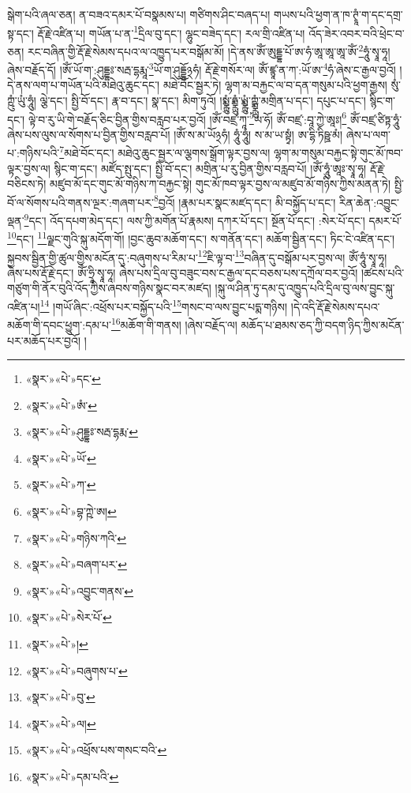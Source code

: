 སྒེག་པའི་ཞལ་ཅན། ན་བཟའ་དམར་པོ་བསྣམས་པ། གཙིགས་ཤིང་བཞད་པ། གཡས་པའི་ཕྱག་ན་ཁ་ཊྭཱཾ་ག་དང་དགྲ་སྟ་དང་། རྡོ་རྗེ་འཛིན་པ། གཡོན་པ་ན་\footnote{«སྣར་»«པེ་»དང་}དྲིལ་བུ་དང་། ལྷུང་བཟེད་དང་། རལ་གྲི་འཛིན་པ། འོད་ཟེར་འབར་བའི་ཕྲེང་བ་ཅན། རང་བཞིན་གྱི་རྡོ་རྗེ་སེམས་དཔའ་ལ་འཁྱུད་པར་བསྒོམ་མོ། །དེ་ནས་ཨོཾ་ཨུདྡྷ་པོ་ཨ་ཧཾ་ཨཱ་ཨཱ་ཨཱ་ཨོཾ་\footnote{«སྣར་»«པེ་»ཨཾ་}ཧཱུཾ་སྭཱ་ཧཱ། ཞེས་བརྗོད་དོ། །ཨོཾ་ཡོ་ག་:ཤུདྡྷཿ་སརྦ་དྷརྨཱ་\footnote{«སྣར་»«པེ་»ཤུདྡྷཿ་སརྦ་དྷརྨ་}ཡོ་ག་ཤུདྡྷོ྅ཧཾ། རྡོ་རྗེ་གསོར་ལ། ཨོཾ་ཛྙཱ་ན་ཀ་:ཡོ་ཨ་\footnote{«སྣར་»«པེ་»ཡོ་}ཧཾ་ཞེས་ང་རྒྱལ་བྱའོ། །དེ་ནས་ལག་པ་གཡོན་པའི་མཐེའུ་ཆུང་དང་། མཐེ་བོང་སྦྱར་ཏེ། ལྷག་མ་བརྐྱང་ལ་བ་དན་གསུམ་པའི་ཕྱག་རྒྱས། སུཾ་ཀྵུཾ་ཡུཾ་ཧཱུཾ། ལྕེ་དང་། སྤྱི་བོ་དང་། རྣ་བ་དང་། སྣ་དང་། མིག་ཏུའོ། །སྨྼྻུཾ་ཧྨྼྻུཾ་ཡྨྼྻུཾ་ཀྵྨྼྻུཾ་མགྲིན་པ་དང་། དཔུང་པ་དང་། སྙིང་ག་དང་། ལྟེ་བ་རུ་ཡི་གེ་བརྗོད་ཅིང་བྱིན་གྱིས་བརླབ་པར་བྱའོ། །ཨོཾ་བཛྲ་ཀཱ་\footnote{«སྣར་»«པེ་»ཀ་}ཡ་ཧོ། ཨོཾ་བཛྲ་:བཱ་ཀྱེ་ཨཱཿ།\footnote{«སྣར་»«པེ་»བྷ་ཀྵེ་ཨ།} ཨོཾ་བཛྲ་ཙིཏྟ་ཧཱུཾ་ཞེས་པས་ལུས་ལ་སོགས་པ་བྱིན་གྱིས་བརླབ་པོ། །ཨོཾ་ས་མ་ཡོ྅ཧཾ། ཧཱུཾ་ཧཱུཾ། ས་མ་ཡ་སྟྭཾ། ཨ་དྷི་ཏིཥྛ་མཾ། ཞེས་པ་ལག་པ་:གཉིས་པའི་\footnote{«སྣར་»«པེ་»གཉིས་ཀའི་}མཐེ་བོང་དང་། མཐེའུ་ཆུང་སྦྱར་ལ་ལྕགས་སྒྲོག་ལྟར་བྱས་ལ། ལྷག་མ་གསུམ་བརྐྱང་སྟེ་གུང་མོ་ཁབ་ལྟར་བྱས་ལ། སྙིང་ག་དང་། མཛོད་སྤུ་དང་། སྤྱི་བོ་དང་། མགྲིན་པ་རུ་བྱིན་གྱིས་བརླབ་པོ། །ཨོཾ་ཧཱུཾ་ཨཱཿ་སྭཱ་ཧཱ། རྡོ་རྗེ་བཅིངས་ཏེ། མཛུབ་མོ་དང་གུང་མོ་གཉིས་ཀ་བརྐྱང་སྟེ། གུང་མོ་ཁབ་ལྟར་བྱས་ལ་མཛུབ་མོ་གཉིས་ཀྱིས་མནན་ཏེ། སྤྱི་བོ་ལ་སོགས་པའི་གནས་ལྔར་:གཞག་པར་\footnote{«སྣར་»«པེ་»བཞག་པར་}བྱའོ། །རྣམ་པར་སྣང་མཛད་དང་། མི་བསྐྱོད་པ་དང་། རིན་ཆེན་:འབྱུང་ལྡན་\footnote{«སྣར་»«པེ་»འབྱུང་གནས་}དང་། འོད་དཔག་མེད་དང་། ལས་ཀྱི་མགོན་པོ་རྣམས། དཀར་པོ་དང་། སྔོན་པོ་དང་། :སེར་པོ་དང་། དམར་པོ་\footnote{«སྣར་»«པེ་»སེར་པོ་}དང་། \footnote{«སྣར་»«པེ་»།  }ལྗང་གུའི་སྐུ་མདོག་གོ། །བྱང་ཆུབ་མཆོག་དང་། ས་གནོན་དང་། མཆོག་སྦྱིན་དང་། ཏིང་ངེ་འཛིན་དང་། སྐྱབས་སྦྱིན་གྱི་ཚུལ་གྱིས་མངོན་དུ་:བཞུགས་པ་རིམ་པ་\footnote{«སྣར་»«པེ་»བཞུགས་པ་}ཇི་ལྟ་བ་\footnote{«སྣར་»«པེ་»བུ་}བཞིན་དུ་བསྒོམ་པར་བྱས་ལ། ཨོཾ་ཧཱུཾ་སྭཱ་ཧཱ། ཞེས་པས་རྡོ་རྗེ་དང་། ཨོཾ་ཧྲཱི་སྭཱ་ཧཱ། ཞེས་པས་དྲིལ་བུ་བཟུང་བས་ང་རྒྱལ་དང་བཅས་པས་དཀྲོལ་བར་བྱའོ། །ཚངས་པའི་གཙུག་གི་ནོར་བུའི་འོད་ཀྱིས་ཞབས་གཉིས་སྣང་བར་མཛད། །སྐུ་ལ་ཤིན་ཏུ་དམ་དུ་འཁྱུད་པའི་དྲིལ་བུ་ལས་བྱུང་སྐུ་འཛིན་པ།\footnote{«སྣར་»«པེ་»ལ།} །གཡོ་ཞིང་:འཕྲོས་པར་བསྐྱོད་པའི་\footnote{«སྣར་»«པེ་»འཕྲོས་པས་གསང་བའི་}གསང་བ་ལས་བྱུང་པདྨ་གཉིས། །དེ་འདི་རྡོ་རྗེ་སེམས་དཔའ་མཆོག་གི་དབང་ཕྱུག་:དམ་པ་\footnote{«སྣར་»«པེ་»དམ་པའི་}མཆོག་གི་གནས། །ཞེས་བརྗོད་ལ། མཆོད་པ་ཐམས་ཅད་ཀྱི་བདག་ཉིད་ཀྱིས་མངོན་པར་མཆོད་པར་བྱའོ། །
